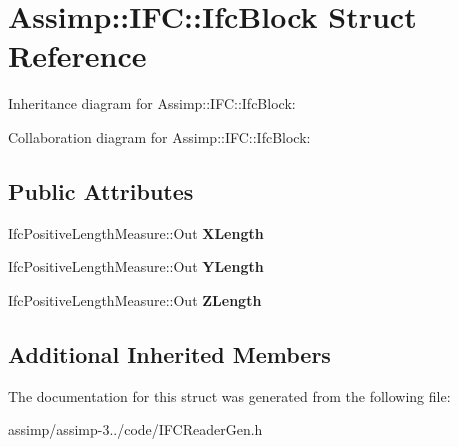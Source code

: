 \hypertarget{struct_assimp_1_1_i_f_c_1_1_ifc_block}{\section{Assimp\+:\+:I\+F\+C\+:\+:Ifc\+Block Struct Reference}
\label{struct_assimp_1_1_i_f_c_1_1_ifc_block}
}


Inheritance diagram for Assimp\+:\+:I\+F\+C\+:\+:Ifc\+Block\+:


Collaboration diagram for Assimp\+:\+:I\+F\+C\+:\+:Ifc\+Block\+:
\subsection*{Public Attributes}
\begin{DoxyCompactItemize}
\item 
\hypertarget{struct_assimp_1_1_i_f_c_1_1_ifc_block_a4126d13bf987a73ad8c8b8a72466e526}{Ifc\+Positive\+Length\+Measure\+::\+Out {\bfseries X\+Length}}\label{struct_assimp_1_1_i_f_c_1_1_ifc_block_a4126d13bf987a73ad8c8b8a72466e526}

\item 
\hypertarget{struct_assimp_1_1_i_f_c_1_1_ifc_block_a6cd254270691a869349cbfb5758ceb52}{Ifc\+Positive\+Length\+Measure\+::\+Out {\bfseries Y\+Length}}\label{struct_assimp_1_1_i_f_c_1_1_ifc_block_a6cd254270691a869349cbfb5758ceb52}

\item 
\hypertarget{struct_assimp_1_1_i_f_c_1_1_ifc_block_aaa9774eda60b24b4b583025392b3a2f6}{Ifc\+Positive\+Length\+Measure\+::\+Out {\bfseries Z\+Length}}\label{struct_assimp_1_1_i_f_c_1_1_ifc_block_aaa9774eda60b24b4b583025392b3a2f6}

\end{DoxyCompactItemize}
\subsection*{Additional Inherited Members}


The documentation for this struct was generated from the following file\+:\begin{DoxyCompactItemize}
\item 
assimp/assimp-\/3../code/I\+F\+C\+Reader\+Gen.\+h\end{DoxyCompactItemize}

